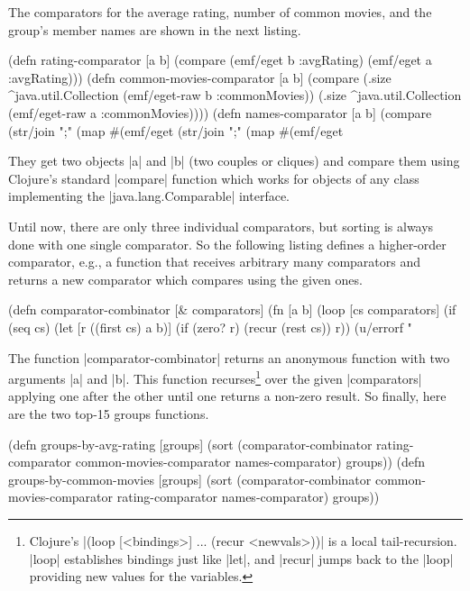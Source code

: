 \documentclass[submission]{eptcs}
\newcommand{\code}{\clojureinline}
\begin{document}
The comparators for the average rating, number of common movies, and the
group's member names are shown in the next listing.

\begin{clojurecode}
(defn rating-comparator [a b]
  (compare (emf/eget b :avgRating) (emf/eget a :avgRating)))
(defn common-movies-comparator [a b]
  (compare (.size ^java.util.Collection (emf/eget-raw b :commonMovies))
           (.size ^java.util.Collection (emf/eget-raw a :commonMovies))))
(defn names-comparator [a b]
  (compare (str/join ";" (map #(emf/eget %
           (str/join ";" (map #(emf/eget %
\end{clojurecode}

They get two objects \code|a| and \code|b| (two couples or cliques) and compare
them using Clojure's standard \code|compare| function which works for objects
of any class implementing the \code|java.lang.Comparable| interface.

Until now, there are only three individual comparators, but sorting is always
done with one single comparator.  So the following listing defines a
higher-order comparator, e.g., a function that receives arbitrary many
comparators and returns a new comparator which compares using the given ones.

\begin{clojurecode}
(defn comparator-combinator [& comparators]
  (fn [a b]
    (loop [cs comparators]
      (if (seq cs)
        (let [r ((first cs) a b)]
          (if (zero? r) (recur (rest cs)) r))
        (u/errorf "%
\end{clojurecode}

The function \code|comparator-combinator| returns an anonymous function with
two arguments \code|a| and \code|b|.  This function recurses\footnote{Clojure's
  \code|(loop [<bindings>] ... (recur <newvals>))| is a local tail-recursion.
  \code|loop| establishes bindings just like \code|let|, and \code|recur| jumps
  back to the \code|loop| providing new values for the variables.} over the
given \code|comparators| applying one after the other until one returns a
non-zero result.  So finally, here are the two top-15 groups functions.

\begin{clojurecode}
(defn groups-by-avg-rating [groups]
  (sort (comparator-combinator rating-comparator common-movies-comparator names-comparator) groups))
(defn groups-by-common-movies [groups]
  (sort (comparator-combinator common-movies-comparator rating-comparator names-comparator) groups))
\end{clojurecode}
\end{document}
